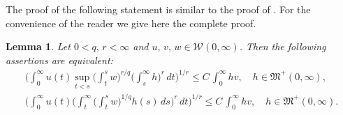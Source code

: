 \documentclass[12pt]{amsart}
\theoremstyle{plain}
\newtheorem{lem}[thm]{Lemma}
\theoremstyle{definition}
\numberwithin{thm}{section}
\numberwithin{equation}{section}
\begin{document}
The proof of the following statement is similar to the proof of \cite[Theorem 4.1, $(4.2) \Leftrightarrow (4.3)$]{GogStep1}.
For the convenience of the reader we give here the complete proof.
\begin{lem}\label{lem.1.5} 
	Let $0 < q,\,r < \infty$ and  $u,\,v,\,w \in {\mathcal W}{(0,\infty)}$.
    Then the following assertions are equivalent:
	\begin{align}
	\bigg( \int_0^{\infty}  u(t) \sup_{t < s} \bigg(
	\int_t^s w \bigg)^{r / q} \bigg( \int_s^{\infty} h\bigg)^r \,dt\bigg)^{1/r} \leq C \, \int_0^{\infty} h v, \quad h \in {\mathfrak M}^+(0,\infty), \label{eq.1.3} \\
	\bigg( \int_0^{\infty}  u(t) \bigg( \int_t^{\infty} \bigg(
	\int_t^s w \bigg)^{1 / q}  h(s) \,ds\bigg)^r \,dt\bigg)^{1/r} \leq C \,\int_0^{\infty} h v, \quad h \in {\mathfrak M}^+(0,\infty). \label{eq.1.4}
	\end{align}
\end{lem}
\end{document}
